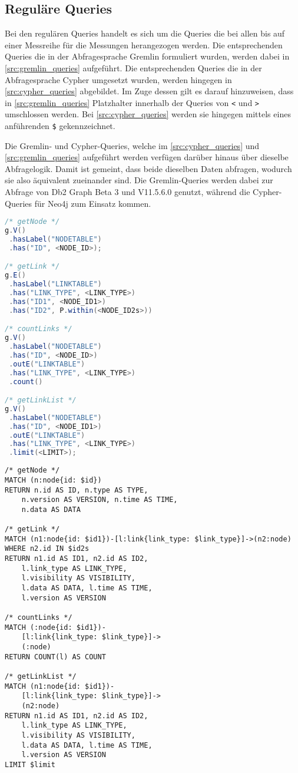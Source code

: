 \subsection{Reguläre Queries}
Bei den regulären Queries handelt es sich um die Queries die bei allen bis auf einer Messreihe für die Messungen herangezogen werden. Die entsprechenden Queries die in der Abfragesprache Gremlin formuliert wurden, werden dabei in \autoref{src:gremlin_queries} aufgeführt. Die entsprechenden Queries die in der Abfragesprache Cypher umgesetzt wurden, werden hingegen in \autoref{src:cypher_queries} abgebildet. Im Zuge dessen gilt es darauf hinzuweisen, dass in \autoref{src:gremlin_queries} Platzhalter innerhalb der Queries von \texttt{<} und \texttt{>} umschlossen werden. Bei \autoref{src:cypher_queries} werden sie hingegen mittels eines anführenden \texttt{\$} gekennzeichnet.

Die Gremlin- und Cypher-Queries, welche im \autoref{src:cypher_queries} und \autoref{src:gremlin_queries} aufgeführt werden verfügen darüber hinaus über dieselbe Abfragelogik. Damit ist gemeint, dass beide dieselben Daten abfragen, wodurch sie also äquivalent zueinander sind. Die Gremlin-Queries werden dabei zur Abfrage von Db2 Graph Beta 3 und V11.5.6.0 genutzt, während die Cypher-Queries für Neo4j zum Einsatz kommen. 

\begin{lstlisting}[label=src:gremlin_queries,caption={ Gremlin Queries (regulär)},language=Java]
/* getNode */
g.V()
 .hasLabel("NODETABLE")
 .has("ID", <NODE_ID>);

/* getLink */
g.E()
 .hasLabel("LINKTABLE")
 .has("LINK_TYPE", <LINK_TYPE>)
 .has("ID1", <NODE_ID1>)
 .has("ID2", P.within(<NODE_ID2s>))

/* countLinks */
g.V()
 .hasLabel("NODETABLE")
 .has("ID", <NODE_ID>)
 .outE("LINKTABLE")
 .has("LINK_TYPE", <LINK_TYPE>)
 .count()

/* getLinkList */
g.V()
 .hasLabel("NODETABLE")
 .has("ID", <NODE_ID1>)
 .outE("LINKTABLE")
 .has("LINK_TYPE", <LINK_TYPE>)
 .limit(<LIMIT>);
\end{lstlisting}

\begin{lstlisting}[label=src:cypher_queries,caption={Cypher Queries (regulär)},language=CQL]
/* getNode */
MATCH (n:node{id: $id}) 
RETURN n.id AS ID, n.type AS TYPE, 
    n.version AS VERSION, n.time AS TIME, 
    n.data AS DATA

/* getLink */
MATCH (n1:node{id: $id1})-[l:link{link_type: $link_type}]->(n2:node) 
WHERE n2.id IN $id2s 
RETURN n1.id AS ID1, n2.id AS ID2, 
    l.link_type AS LINK_TYPE, 
    l.visibility AS VISIBILITY, 
    l.data AS DATA, l.time AS TIME, 
    l.version AS VERSION

/* countLinks */
MATCH (:node{id: $id1})-
    [l:link{link_type: $link_type}]->
    (:node) 
RETURN COUNT(l) AS COUNT

/* getLinkList */
MATCH (n1:node{id: $id1})-
    [l:link{link_type: $link_type}]->
    (n2:node) 
RETURN n1.id AS ID1, n2.id AS ID2, 
    l.link_type AS LINK_TYPE, 
    l.visibility AS VISIBILITY, 
    l.data AS DATA, l.time AS TIME, 
    l.version AS VERSION 
LIMIT $limit
\end{lstlisting}

